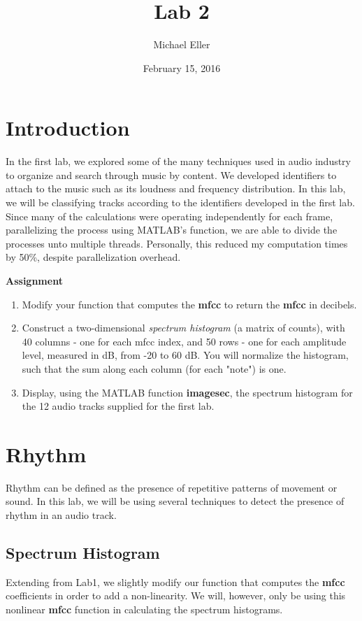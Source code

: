 \documentclass{article} %
\title{Lab 2}
\author{Michael Eller}
\date{February 15, 2016} %
\begin{document}
\maketitle

\tableofcontents
\clearpage
\section{Introduction}
In the first lab, we explored some of the many techniques used in audio industry to organize and search through music by content. We developed identifiers to
attach to the music such as its loudness and frequency distribution. In this lab, we will be classifying tracks according to the identifiers developed in the first lab. 
Since many of the calculations were operating independently for each frame, parallelizing the process using MATLAB's  function, we are able
to divide the processes unto multiple threads. Personally, this reduced my computation times by 50\%, despite parallelization overhead. 

\begin{framed}
\textbf{Assignment}
\begin{enumerate}
\item Modify your function that computes the \textbf{mfcc} to return the \textbf{mfcc} in decibels. 
\item Construct a two-dimensional \emph{spectrum histogram} (a matrix of counts), with 40 columns - one for each mfcc index, and 50 rows - one
for each amplitude level, measured in dB, from -20 to 60 dB. You will normalize the histogram, such that the sum along each column (for each "note") is one.
\item Display, using the MATLAB function \textbf{imagesec}, the spectrum histogram for the 12 audio tracks supplied for the first lab. 
\end{enumerate}
\end{framed}

\section{Rhythm}
Rhythm can be defined as the presence of repetitive patterns of movement or sound. In this lab, we will be using several techniques to detect the presence
of rhythm in an audio track.

\subsection{Spectrum Histogram}
Extending from Lab1, we slightly modify our function that computes the \textbf{mfcc} coefficients in order to add a non-linearity. We will, however, only be using
this nonlinear \textbf{mfcc} function in calculating the spectrum histograms. 
\end{document}
